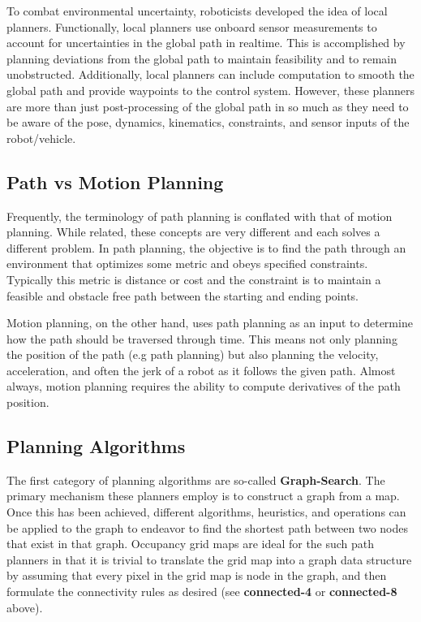 To combat environmental uncertainty, roboticists developed the idea of local planners. Functionally, local planners use onboard sensor measurements to account for uncertainties in the global path in realtime. This is accomplished by planning deviations from the global path to maintain feasibility and to remain unobstructed. Additionally, local planners can include computation to smooth the global path and provide waypoints to the control system. However, these planners are more than just post-processing of the global path in so much as they need to be aware of the pose, dynamics, kinematics, constraints, and sensor inputs of the robot/vehicle.

\subsection{Path vs Motion Planning}
Frequently, the terminology of path planning is conflated with that of motion planning. While related, these concepts are very different and each solves a different problem. In path planning, the objective is to find the path through an environment that optimizes some metric and obeys specified constraints. Typically this metric is distance or cost and the constraint is to maintain a feasible and obstacle free path between the starting and ending points. 

Motion planning, on the other hand, uses path planning as an input to determine how the path should be traversed through time. This means not only planning the position of the path (e.g path planning) but also planning the velocity, acceleration, and often the jerk of a robot as it follows the given path. Almost always, motion planning requires the ability to compute derivatives of the path position. 

\subsection{Planning Algorithms}

The first category of planning algorithms are so-called \textbf{Graph-Search}. The primary mechanism these planners employ is to construct a graph from a map. Once this has been achieved, different algorithms, heuristics, and operations can be applied to the graph to endeavor to find the shortest path between two nodes that exist in that graph. Occupancy grid maps are ideal for the such path planners in that it is trivial to translate the grid map into a graph data structure by assuming that every pixel in the grid map is node in the graph, and then formulate the connectivity rules as desired (see \textbf{connected-4} or \textbf{connected-8} above). 

